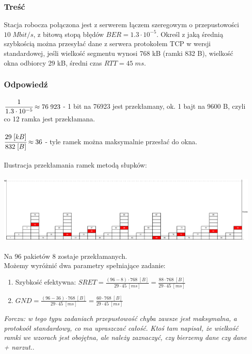 		\subsubsection{Treść}
			Stacja robocza połączona jest z serwerem łączem szeregowym o przepustowości $ 10\;Mbit/s $, z bitową stopą błędów $ BER=1.3\cdot 10^{-5} $. Określ z jaką średnią szybkością można przesyłać dane z serwera protokołem TCP w wersji standardowej, jeśli wielkość segmentu wynosi 768 kB (ramki 832 B), wielkość okna odbiorcy 29 kB, średni czas $ RTT=45\;ms $.
		\subsubsection{Odpowiedź}
			$ \cfrac{1}{1.3\cdot 10^{-5}}\approx 76\;923 $ - 1 bit na 76923 jest przekłamany, ok. 1 bajt na 9600 B, czyli co 12 ramka jest przekłamana.\\\\
			$ \cfrac{29\;[kB]}{832\;[B]}\approx 36 $ - tyle ramek można maksymalnie przesłać do okna.\\\\
			Ilustracja przekłamania ramek metodą słupków:\\\\
			\includegraphics[width=16.0cm]{./images/zadanie08.pdf}\\\\
			Na 96 pakietów 8 zostaje przekłamanych.\\
			Możemy wyróżnić dwa parametry spełniające zadanie:
			\begin{enumerate}
				\item Szybkość efektywna: $ SRET=\frac{(96-8)\cdot 768\;[B]}{29\cdot 45\;[ms]}=\frac{88\cdot 768\;[B]}{29\cdot 45\;[ms]} $
				\item $ GND=\frac{(96-36)\cdot 768\;[B]}{29\cdot 45\;[ms]}=\frac{60\cdot 768\;[B]}{29\cdot 45\;[ms]} $
			\end{enumerate}
			\small{ \emph{Forczu: w tego typu zadaniach przepustowość chyba zawsze jest maksymalna, a protokoół standardowy, co ma upraszczać całość.
			Ktoś tam napisał, że wielkość ramki we wzorach jest obojętna, ale należy zaznaczyć, czy bierzemy dane czy dane + narzut.}}.
